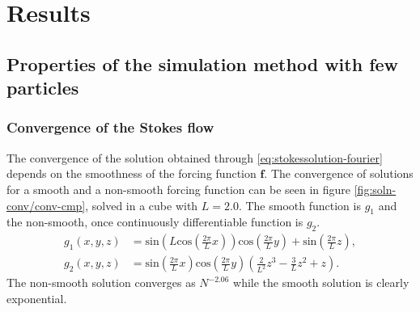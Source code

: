 \documentclass[a4paper,
twoside=false,abstract=false,numbers=noenddot,
titlepage=false,headings=small,parskip=half,version=last]{scrartcl}
\begin{document}
\section{Results}

\subsection{Properties of the simulation method with few particles}

\subsubsection{Convergence of the Stokes flow}
The convergence of the solution obtained through \eqref{eq:stokessolution-fourier} depends on the smoothness of the forcing function $\mathbf{f}$.
The convergence of solutions for a smooth and a non-smooth forcing function can be seen in figure \ref{fig:soln-conv/conv-cmp}, solved in a cube with $L=2.0$.
The smooth function is $g_1$ and the non-smooth, once continuously differentiable function is $g_2$.
\begin{align}
g_1(x,y,z) &= \text{sin}(L\text{cos}(\frac{2\pi}{L}x))\text{cos}(\frac{2\pi}{L}y) + \text{sin}(\frac{2\pi}{L}z),\nonumber\\
g_2(x,y,z) &= \text{sin}(\frac{2\pi}{L}x)\text{cos}(\frac{2\pi}{L}y)(\frac{2}{L^2}z^3 - \frac{3}{L} z^2 + z).\nonumber
\end{align}
The non-smooth solution converges as $N^{-2.06}$ while the smooth solution is clearly exponential.

\end{document}
